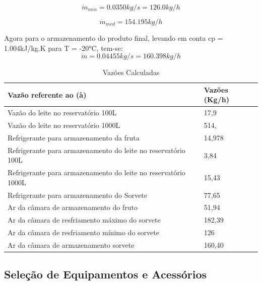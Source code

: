 \documentclass[10pt,a4paper]{article}
\begin{document}
 \begin{equation}
     \dot{m}_{min} = 0.0350kg/s =  126.0 kg/h
 \end{equation}
 
 \begin{equation}
     \dot{m}_{med} = 154.195 kg/h
 \end{equation}

Agora para o armazenamento do produto final, levando em conta cp = 1.004kJ/kg.K para T = -20°C, tem-se:
\begin{equation}
     \dot{m} = 0.04455kg/s = 160.398kg/h
\end{equation}

\newpage

\begin{table}[h]
\centering
\caption{Vazões Calculadas}
\begin{tabular}{|l|l|}
\hline
Vazão referente ao (à)   & Vazões (Kg/h)  \\ \hline
Vazão do leite no reservatório 100L    & 17,9                  \\ \hline
Vazão do leite no reservatório 1000L      & 514,                  \\ \hline
Refrigerante para armazenamento da fruta     & 14,978                  \\ \hline
Refrigerante para armazenamento do leite no reservatório 100L    & 3,84               \\ \hline
Refrigerante para armazenamento do leite no reservatório 1000L    & 15,43                \\ \hline
Refrigerante para armazenamento do Sorvete    & 77,65               \\ \hline
Ar da câmara de armazenamento do fruto    & 51,94               \\ \hline
Ar da câmara de resfriamento máximo do sorvete    & 182,39               \\ \hline
Ar da câmara de resfriamento mínimo do sorvete    & 126               \\ \hline
Ar da câmara de armazenamento sorvete    & 160,40               \\ \hline
\end{tabular}
\label{tab vaz}
\end{table}

\subsection{{Seleção de Equipamentos e Acessórios}}
\end{document}
